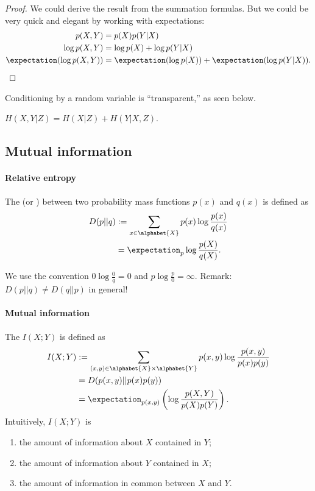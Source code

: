 \documentclass[a4paper, 11pt, openany]{book}
\begin{document}
\begin{proof}
We could derive the result from the summation formulas. But we could be very quick and elegant by working with expectations:
\begin{align*}
	p(X,Y) &= p(X) p(Y|X)\\
	\log p(X,Y) &= \log p(X) + \log p(Y|X)\\
	\expectation ( \log p(X,Y) ) &= \expectation ( \log p(X) ) + \expectation (\log p(Y|X)).
\end{align*}
\end{proof}

Conditioning by a random variable is ``transparent,'' as seen below.

\begin{corollary}
$H(X,Y|Z) = H(X|Z) + H(Y|X,Z)$.
\end{corollary}




\subsection{Mutual information}


\paragraph{Relative entropy}


The  (or ) between two probability mass functions $p(x)$ and $q(x)$ is defined as
\begin{align*}
	D(p||q) &:= \sum_{x \in \alphabet{X}} p(x) \log \frac{p(x)}{q(x)}\\
	&= \expectation_p \log\frac{p(X)}{q(X)}.
\end{align*}

We use the convention $0 \log \frac{0}{q} = 0$ and $p \log \frac{p}{0} = \infty$. Remark: $D(p||q) \ne D(q||p)$ in general!



\paragraph{Mutual information}

The  $I(X;Y)$ is defined as
\begin{align*}
	I(X;Y) &:= \sum_{(x,y) \in \alphabet{X} \times \alphabet{Y}} p(x,y) \log \frac{p(x,y)}{p(x)p(y)}\\
	&= D(p(x,y) || p(x) p(y))\\
	&= \expectation_{p(x,y)} \left( \log \frac{p(X,Y)}{p(X)p(Y)} \right).
\end{align*}
Intuitively, $I(X;Y)$ is
\begin{enumerate}
	\item the amount of information about $X$ contained in $Y$;

	\item the amount of information about $Y$ contained in $X$;

	\item the amount of information in common between $X$ and $Y$.
\end{enumerate}
\end{document}
